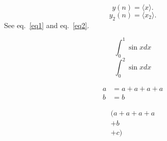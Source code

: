 \documentclass[10pt]{book}
\begin{document}
\begin{equation} %
y(n) = \langle x\rangle. %
\label{eq1}
\end{equation} %
\begin{equation} %
y_2(n) 
\label{eq2}
= \langle x_2\rangle. %
\end{equation} %
See eq.~\ref{eq1} and eq.~\ref{eq2}.


\begin{equation}
  \label{test1}
  \int_0^1\sin x dx
\end{equation}
\begin{equation}
  \int_0^2\sin x dx
  \label{test2}
\end{equation}

\begin{align}
a &= a + a + a + a \\
b &= b
\end{align}

\begin{multline}
( a + a + a + a \\
 + b		\\
 + c )
\end{multline}
\end{document}
